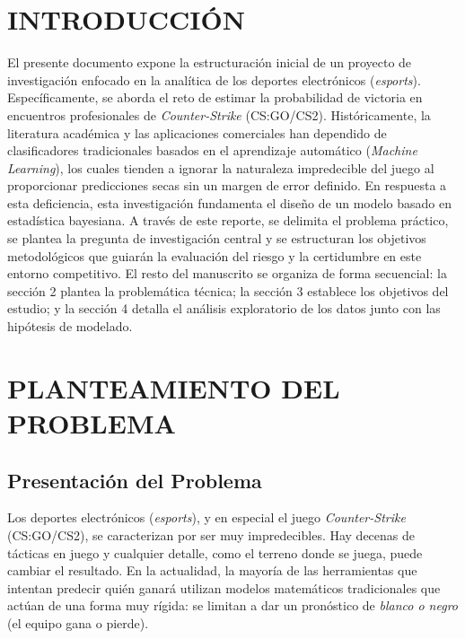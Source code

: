 \documentclass[twocolumn,10pt]{article}
\begin{document}
\thispagestyle{fancyplain} %


\section{INTRODUCCIÓN}

\justifying
El presente documento expone la estructuración inicial de un proyecto de investigación enfocado en la analítica de los deportes electrónicos (\textit{esports}). Específicamente, se aborda el reto de estimar la probabilidad de victoria en encuentros profesionales de \textit{Counter-Strike} (CS:GO/CS2). Históricamente, la literatura académica y las aplicaciones comerciales han dependido de clasificadores tradicionales basados en el aprendizaje automático (\textit{Machine Learning}), los cuales tienden a ignorar la naturaleza impredecible del juego al proporcionar predicciones secas sin un margen de error definido. En respuesta a esta deficiencia, esta investigación fundamenta el diseño de un modelo basado en estadística bayesiana. A través de este reporte, se delimita el problema práctico, se plantea la pregunta de investigación central y se estructuran los objetivos metodológicos que guiarán la evaluación del riesgo y la certidumbre en este entorno competitivo. El resto del manuscrito se organiza de forma secuencial: la sección 2 plantea la problemática técnica; la sección 3 establece los objetivos del estudio; y la sección 4 detalla el análisis exploratorio de los datos junto con las hipótesis de modelado.

\section{PLANTEAMIENTO DEL PROBLEMA}

\subsection{Presentación del Problema}

Los deportes electrónicos (\textit{esports}), y en especial el juego \textit{Counter-Strike} (CS:GO/CS2), se caracterizan por ser muy impredecibles. Hay decenas de tácticas en juego y cualquier detalle, como el terreno donde se juega, puede cambiar el resultado. En la actualidad, la mayoría de las herramientas que intentan predecir quién ganará utilizan modelos matemáticos tradicionales que actúan de una forma muy rígida: se limitan a dar un pronóstico de \textit{blanco o negro} (el equipo gana o pierde).
\end{document}
